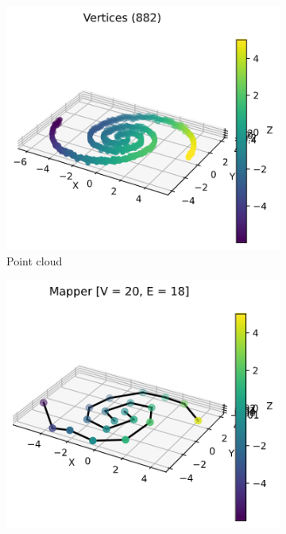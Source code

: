 \documentclass{article}
\begin{document}
\begin{figure}[ht]
    \centering
    \begin{subfigure}[c]{0.3\columnwidth}
        \centering
        \includegraphics[width=\textwidth]{spirals-point-cloud}
        \caption{Point cloud}
        \label{fig:spirals-points}
    \end{subfigure}
    \begin{subfigure}[c]{0.3\columnwidth}
        \centering
        \includegraphics[width=\textwidth]{spirals-graph-3d}

\end{subfigure}
\end{figure}
\end{document}
